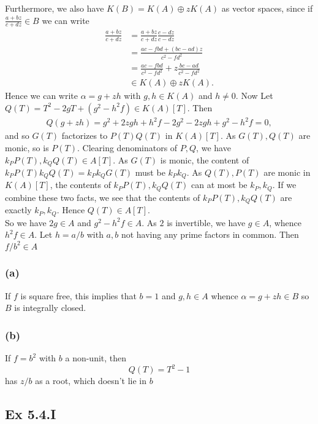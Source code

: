 \documentclass{article}
\theoremstyle{definition}
\begin{document}
Furthermore, we also have $K(B) = K(A) \oplus z K(A)$ as vector spaces, since
if $\frac{a + b z}{c + d z} \in B$ we can write
\begin{align*}
	\frac{a + b z}{c + d z}
	 & =
	\frac{a + b z}{c + d z}
	\frac{c - d z}{c - d z}                     \\
	 & =
	\frac{ac - f bd + (bc - ad) z}{c^2 - f d^2} \\
	 & =
	\frac{ac - f bd}{c^2 - f d^2}
	+
	z \frac{bc - ad}{c^2 - f d^2}               \\
	 & \in K(A) \oplus z K(A).
\end{align*}
Hence we can write $\alpha = g + z h$ with $g, h \in K(A)$ and $h \not = 0$.
Now Let $Q(T) = T^2 - 2gT + (g^2 - h^2 f) \in K(A)[T]$. Then
\begin{align*}
	Q(g + z h)
	=
	g^2 + 2 z gh + h^2 f
	-
	2 g^2 - 2 z gh
	+ g^2 - h^2 f
	= 0,
\end{align*}
and so $G(T)$ factorizes to $P(T)Q(T)$ in $K(A)[T]$. As $G(T), Q(T)$ are monic,
so is $P(T)$. Clearing denominators of $P, Q$, we have $k_P P(T), k_Q Q(T) \in
	A[T]$. As $G(T)$ is monic, the content of $k_P P(T) k_Q Q(T) = k_P k_Q G(T)$
must be $k_P k_Q$. As $Q(T), P(T)$ are monic in $K(A)[T]$, the contents of $k_P
	P(T), k_Q Q(T)$ can at most be $k_P, k_Q$. If we combine these two facts, we
see that the contents of $k_P P(T), k_Q Q(T)$ are exactly $k_P, k_Q$. Hence
$Q(T) \in A[T]$. \\

So we have $2g \in A$ and $g^2 - h^2 f \in A$. As $2$ is invertible, we have $g \in A$,
whence $h^2 f \in A$. Let $h = a/b$ with $a, b$ not having any prime factors in common.
Then $f/b^2 \in A$

\subsubsection*{(a)}

If $f$ is square free, this implies that $b = 1$ and $g, h \in A$ whence
$\alpha = g + z h \in B$ so $B$ is integrally closed.

\subsubsection*{(b)}
If $f = b^2$ with $b$ a non-unit, then
\[
	Q(T)
	=
	T^2
	-
	1
\]
has $z / b$ as a root, which doesn't lie in $b$


\subsection*{Ex 5.4.I}
\end{document}
